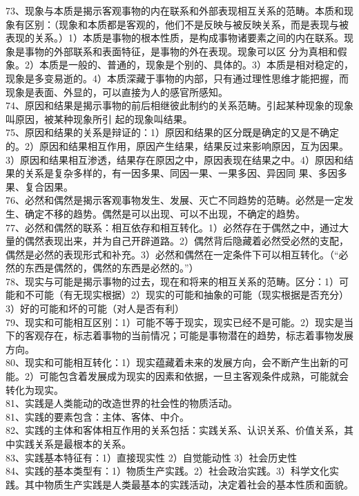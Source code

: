 \documentclass[a4paper,fleqn]{article}
\begin{document}
73、现象与本质是揭示客观事物的内在联系和外部表现相互关系的范畴。本质和现象有区别：（现象和本质都是客观的，他们不是反映与被反映关系，而是表现与被表现的关系。）1）本质是事物的根本性质，是构成事物诸要素之间的内在联系。现象是事物的外部联系和表面特征，是事物的外在表现。现象可以区 分为真相和假象。2）本质是一般的、普通的，现象是个别的、具体的。3）本质是相对稳定的，现象是多变易逝的。4）本质深藏于事物的内部，只有通过理性思维才能把握，而现象是表面、外显的，可以直接为人的感官所感知。 \\
74、原因和结果是揭示事物的前后相继彼此制约的关系范畴。引起某种现象的现象叫原因，被某种现象所引 起的现象叫结果。 \\
75、原因和结果的关系是辩证的：1）原因和结果的区分既是确定的又是不确定的。2）原因和结果相互作用，原因产生结果，结果反过来影响原因，互为因果。3）原因和结果相互渗透，结果存在原因之中，原因表现在结果之中。4）原因和结果的关系是复杂多样的，有一因多果、同因一果、一果多因、异因同 果、多因多果、复合因果。 \\
76、必然和偶然是揭示客观事物发生、发展、灭亡不同趋势的范畴。必然是一定发生、确定不移的趋势。偶然是可以出现、可以不出现，不确定的趋势。 \\
77、必然和偶然的联系：相互依存和相互转化。1）必然存在于偶然之中，通过大量的偶然表现出来，并为自己开辟道路。2）偶然背后隐藏着必然受必然的支配，偶然是必然的表现形式和补充。3）必然和偶然在一定条件下可以相互转化。（“必然的东西是偶然的，偶然的东西是必然的。”） \\
78、现实与可能是揭示事物的过去，现在和将来的相互关系的范畴。区分：1）可能和不可能（有无现实根据）2）现实的可能和抽象的可能（现实根据是否充分）3）好的可能和坏的可能（对人是否有利） \\
79、现实和可能相互区别：1）可能不等于现实，现实已经不是可能。2）现实是当下的客观存在，标志着事物的当前情况；可能是事物潜在的趋势，标志着事物发展方向。 \\
80、现实和可能相互转化：1）现实蕴藏着未来的发展方向，会不断产生出新的可能。2）可能包含着发展成为现实的因素和依据，一旦主客观条件成熟，可能就会转化为现实。 \\
81、实践是人类能动的改造世界的社会性的物质活动。 \\
81、实践的要素包含：主体、客体、中介。 \\
82、实践的主体和客体相互作用的关系包括：实践关系、认识关系、价值关系，其中实践关系是最根本的关系。 \\
83、实践基本特征有：1）直接现实性 2）自觉能动性 3）社会历史性  \\
84、实践的基本类型有：1）物质生产实践。2）社会政治实践。3）科学文化实践。其中物质生产实践是人类最基本的实践活动，决定着社会的基本性质和面貌。 \\
\end{document}

